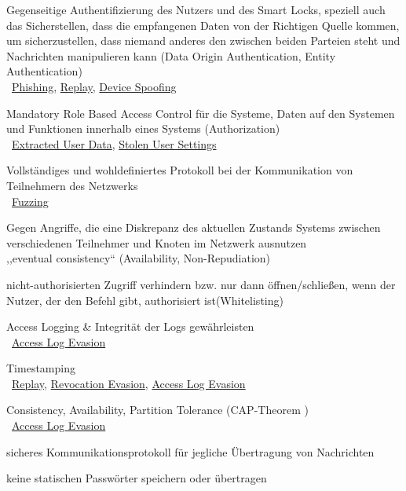     \begin{SA}[noitemsep]
        \item \label{sa:1}Gegenseitige Authentifizierung des Nutzers und des Smart Locks, speziell auch das Sicherstellen, dass die empfangenen Daten von der Richtigen Quelle kommen, um sicherzustellen, dass niemand anderes den zwischen beiden Parteien steht und Nachrichten manipulieren kann (Data Origin Authentication, Entity Authentication)\\
            \textrightarrow\ \hyperref[vuln:phishing]{Phishing}, \hyperref[vuln:replay]{Replay}, \hyperref[vuln:spoofing]{Device Spoofing}
        \item \label{sa:2}Mandatory Role Based Access Control für die Systeme, Daten auf den Systemen und Funktionen innerhalb eines Systems (Authorization) \cite{Miessler2015}\\ 
            \textrightarrow\ \hyperref[vuln:userdata]{Extracted User Data}, \hyperref[vuln:usersettings]{Stolen User Settings}
        \item \label{sa:3}Vollständiges und wohldefiniertes Protokoll bei der Kommunikation von Teilnehmern des Netzwerks\\
            \textrightarrow\ \hyperref[vuln:fuzzing]{Fuzzing}
        \item \label{sa:4}Gegen Angriffe, die eine Diskrepanz des aktuellen Zustands Systems zwischen verschiedenen Teilnehmer und Knoten im Netzwerk ausnutzen\\
            \textrightarrow ,,eventual consistency`` (Availability, Non-Repudiation)\cite{Ho2016}
        \item \label{sa:5}nicht-authorisierten Zugriff verhindern bzw. nur dann öffnen/schließen, wenn der Nutzer, der den Befehl gibt, authorisiert ist(Whitelisting) \cite{Ho2016}
        \item \label{sa:6}Access Logging \& Integrität der Logs gewährleisten\\
            \textrightarrow\ \hyperref[vuln:accesslogevasion]{Access Log Evasion}
        \item \label{sa:7}Timestamping\\
            \textrightarrow\ \hyperref[vuln:replay]{Replay}, \hyperref[vuln:revocationevasion]{Revocation Evasion}, \hyperref[vuln:accesslogevasion]{Access Log Evasion}
        \item \label{sa:8}Consistency, Availability, Partition Tolerance (CAP-Theorem \cite{Brewer2012})\\
            \textrightarrow\ \hyperref[vuln:accesslogevasion]{Access Log Evasion}
        \item \label{sa:9}sicheres Kommunikationsprotokoll für jegliche Übertragung von Nachrichten\cite{Miessler,Ye2017}
        \item \label{sa:10}keine statischen Passwörter speichern oder übertragen\cite{Rose2016}
    \end{SA}
